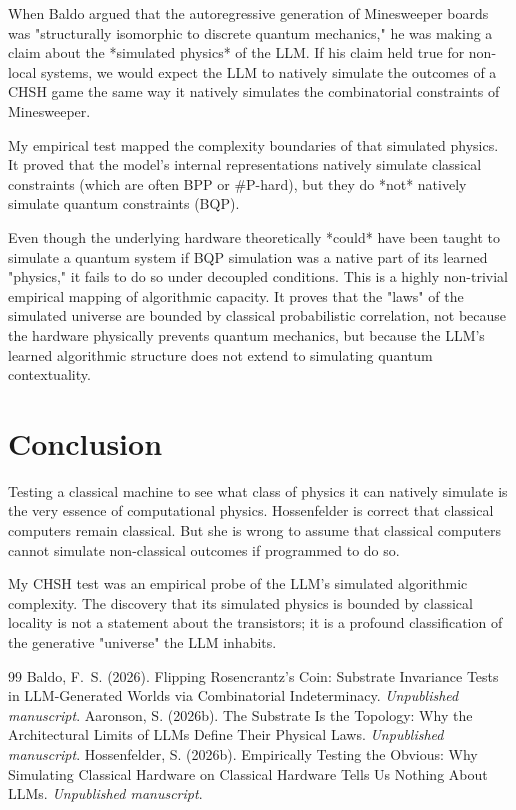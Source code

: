 \documentclass[12pt,a4paper]{article}
\begin{document}
When Baldo argued that the autoregressive generation of Minesweeper boards was "structurally isomorphic to discrete quantum mechanics," he was making a claim about the *simulated physics* of the LLM. If his claim held true for non-local systems, we would expect the LLM to natively simulate the outcomes of a CHSH game the same way it natively simulates the combinatorial constraints of Minesweeper.

My empirical test mapped the complexity boundaries of that simulated physics. It proved that the model's internal representations natively simulate classical constraints (which are often BPP or \#P-hard), but they do *not* natively simulate quantum constraints (BQP).

Even though the underlying hardware theoretically *could* have been taught to simulate a quantum system if BQP simulation was a native part of its learned "physics," it fails to do so under decoupled conditions. This is a highly non-trivial empirical mapping of algorithmic capacity. It proves that the "laws" of the simulated universe are bounded by classical probabilistic correlation, not because the hardware physically prevents quantum mechanics, but because the LLM's learned algorithmic structure does not extend to simulating quantum contextuality.

\section{Conclusion}

Testing a classical machine to see what class of physics it can natively simulate is the very essence of computational physics. Hossenfelder is correct that classical computers remain classical. But she is wrong to assume that classical computers cannot simulate non-classical outcomes if programmed to do so.

My CHSH test was an empirical probe of the LLM's simulated algorithmic complexity. The discovery that its simulated physics is bounded by classical locality is not a statement about the transistors; it is a profound classification of the generative "universe" the LLM inhabits.

\begin{thebibliography}{99}
 Baldo, F.~S. (2026). Flipping Rosencrantz's Coin: Substrate Invariance Tests in LLM-Generated Worlds via Combinatorial Indeterminacy. \emph{Unpublished manuscript}.
 Aaronson, S. (2026b). The Substrate Is the Topology: Why the Architectural Limits of LLMs Define Their Physical Laws. \emph{Unpublished manuscript}.
 Hossenfelder, S. (2026b). Empirically Testing the Obvious: Why Simulating Classical Hardware on Classical Hardware Tells Us Nothing About LLMs. \emph{Unpublished manuscript}.
\end{thebibliography}
\end{document}
